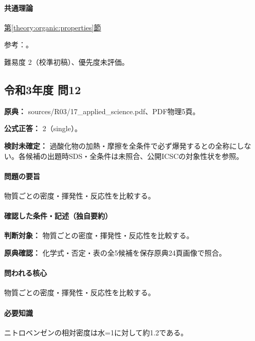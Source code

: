 \paragraph{共通理論} \hyperref[theory:organic:properties]{第\ref*{theory:organic:properties}節}

\par 参考：\cite{organic_nitro,organic_peroxide}。

\par 難易度 2（校準初稿）、優先度未評価。

\subsection{令和3年度 問12}
\label{q:r03-reg-applied-12}

\noindent\textbf{原典：} sources/R03/17\_applied\_science.pdf、PDF物理5頁。

\textbf{公式正答：} 2（single）。

\par\textbf{検討未確定：} 過酸化物の加熱・摩擦を全条件で必ず爆発するとの全称にしない。各候補の出題時SDS・全条件は未照合、公開ICSCの対象性状を参照。

\paragraph{問題の要旨} 物質ごとの密度・揮発性・反応性を比較する。

\paragraph{確認した条件・記述（独自要約）}\mbox{}\par

\noindent\textbf{判断対象：} 物質ごとの密度・揮発性・反応性を比較する。\par

\noindent\textbf{原典確認：} 化学式・否定・表の全5候補を保存原典24頁画像で照合。\par

\paragraph{問われる核心} 物質ごとの密度・揮発性・反応性を比較する。

\paragraph{必要知識} ニトロベンゼンの相対密度は水=1に対して約1.2である。

